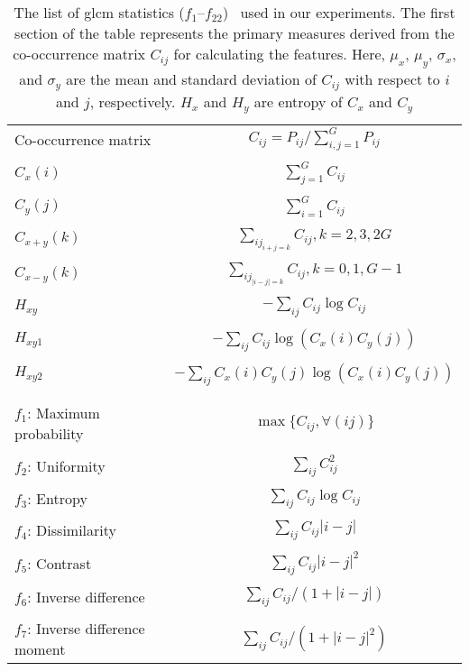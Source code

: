 	\begin{longtable}{lc}
	\caption[Extracted features by \ac{glcm} descriptor]{The list of \ac{glcm} statistics ($f_{1}$--$f_{22}$)~\cite{haralick1973textural,clausi2002analysis,soh1999texture} used in our experiments.
	The first section of the table represents the primary measures derived from the co-occurrence matrix $C_{ij}$ for calculating the features.
	Here, $\mu_{x}$, $\mu_{y}$, $\sigma_{x}$, and $\sigma_{y}$ are the mean and standard deviation of $C_{ij}$ with respect to $i$ and $j$, respectively.
	$H_{x}$ and $H_{y}$ are entropy of $C_{x}$ and $C_{y}$}\\
	\toprule
	Co-occurrence matrix & $C_{ij} = P_{ij}/\sum_{i,j=1}^{G} P_{ij}$\\
	& \\[-0.8ex]	
	$C_{x}(i)$ & $\sum_{j=1}^{G}C_{ij}$\\
	& \\[-0.8ex]	
	$C_{y}(j)$ & $\sum_{i=1}^{G}C_{ij}$\\
	& \\[-0.8ex]	
	$C_{x+y}(k)$ & $\sum_{{ij}_{i+j=k}} C_{ij}, k = 2,3 , 2G$ \\
	& \\[-0.8ex]	
	$C_{x-y}(k)$ & $\sum_{{ij}_{|i-j|=k}} C_{ij}, k = 0,1 , G-1$ \\	
	& \\[-0.8ex]	
	$H_{xy}$ & $-\sum_{ij}C_{ij}\log C_{ij}$ \\	
	& \\[-0.8ex]	
	$H_{xy1}$ & $-\sum_{ij}C_{ij}\log(C_{x}(i)C_{y}(j))$\\
	& \\[-0.8ex]	
	$H_{xy2}$ & $-\sum_{ij}C_{x}(i)C_{y}(j)\log(C_{x}(i)C_{y}(j))$\\
	& \\[-0.8ex]	
	\hdashline	
	& \\[-0.8ex]		
	$f_{1}$: Maximum probability & $\max\{C_{ij} , \forall (ij)\}$ \\
	& \\[-0.8ex]
	$f_{2}$: Uniformity & $\sum_{ij} C_{ij}^{2}$ \\
	& \\[-0.8ex]
	$f_{3}$: Entropy & $\sum_{ij}C_{ij}\log C_{ij}$\\
	& \\[-0.8ex]
	$f_{4}$: Dissimilarity & $\sum_{ij} C_{ij}|i-j|$\\
	& \\[-0.8ex]
	$f_{5}$: Contrast & $\sum_{ij}C_{ij}|i-j|^{2}$ \\
	& \\[-1ex]
	$f_{6}$: Inverse difference & $\sum_{ij}C_{ij}/(1+|i-j|)$ \\
	&  \\[-1ex]
	$f_{7}$: Inverse difference moment & $\sum_{ij}C_{ij}/(1+|i-j|^{2})$ \\
	

\end{longtable}
